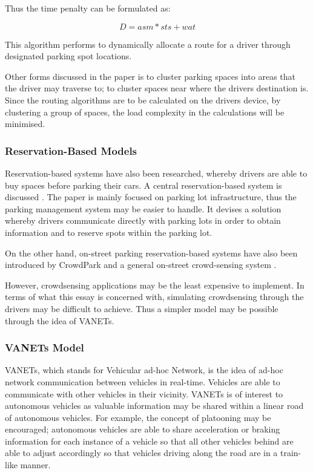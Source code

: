 Thus the time penalty can be formulated as:

\[ D = asm * sts + wat \]

This algorithm performs to dynamically allocate a route for a driver through designated parking spot locations.

Other forms discussed in the paper \cite{6} is to cluster parking spaces into areas that the driver may traverse to; to cluster spaces near where the drivers destination is. Since the routing algorithms are to be calculated on the drivers device, by clustering a group of spaces, the load complexity in the calculations will be minimised.

\subsubsection{Reservation-Based Models}
Reservation-based systems have also been researched, whereby drivers are able to buy spaces before parking their cars. A central reservation-based system is discussed \cite{2}. The paper is mainly focused on parking lot infrastructure, thus the parking management system may be easier to handle. It devises a solution whereby drivers communicate directly with parking lots in order to obtain information and to reserve spots within the parking lot.

On the other hand, on-street parking reservation-based systems have also been introduced by CrowdPark \cite{8} and a general on-street crowd-sensing system \cite{9}.

However, crowdsensing applications may be the least expensive to implement. In terms of what this essay is concerned with, simulating crowdsensing through the drivers may be difficult to achieve. Thus a simpler model may be possible through the idea of VANETs.

\subsubsection{VANETs Model}
VANETs, which stands for Vehicular ad-hoc Network, is the idea of ad-hoc network communication between vehicles in real-time. Vehicles are able to communicate with other vehicles in their vicinity. VANETs is of interest to autonomous vehicles as valuable information may be shared within a linear road of autonomous vehicles. For example, the concept of platooning may be encouraged; autonomous vehicles are able to share acceleration or braking information for each instance of a vehicle so that all other vehicles behind are able to adjust accordingly so that vehicles driving along the road are in a train-like manner.

